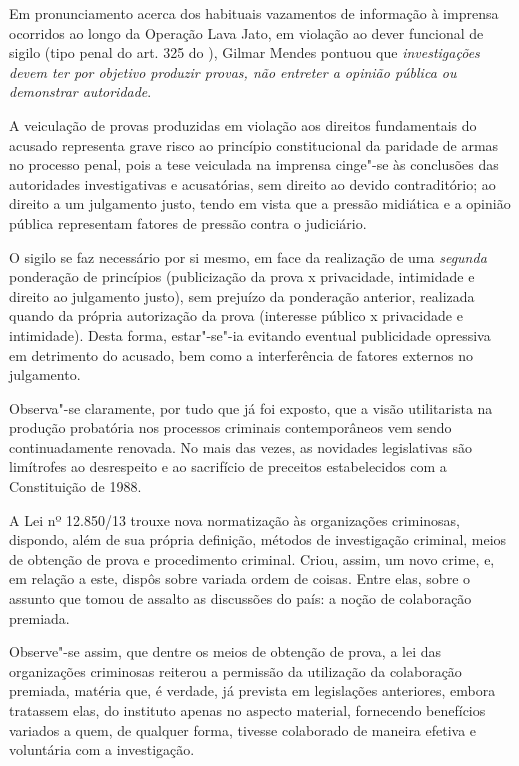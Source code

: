Em pronunciamento acerca dos habituais vazamentos de informação à
imprensa ocorridos ao longo da Operação Lava Jato, em violação ao dever
funcional de sigilo (tipo penal do art. 325 do ), Gilmar Mendes
pontuou que \emph{investigações devem ter por objetivo
produzir provas, não entreter a opinião pública ou demonstrar
autoridade}.

A veiculação de provas produzidas em violação aos direitos fundamentais
do acusado representa grave risco ao princípio constitucional da
paridade de armas no processo penal, pois a tese veiculada na imprensa
cinge"-se às conclusões das autoridades investigativas e acusatórias, sem
direito ao devido contraditório; ao direito a um julgamento justo, tendo
em vista que a pressão midiática e a opinião pública representam fatores
de pressão contra o judiciário.

O sigilo se faz necessário por si mesmo, em face da realização de uma
\emph{segunda} ponderação de princípios (publicização da prova x
privacidade, intimidade e direito ao julgamento justo), sem prejuízo da
ponderação anterior, realizada quando da própria autorização da prova
(interesse público x privacidade e intimidade). Desta forma, estar"-se"-ia
evitando eventual publicidade opressiva em detrimento do acusado, bem
como a interferência de fatores externos no julgamento.

Observa"-se claramente, por tudo que já foi exposto, que a visão
utilitarista na produção probatória nos processos criminais
contemporâneos vem sendo continuadamente renovada. No mais das vezes, as
novidades legislativas são limítrofes ao desrespeito e ao sacrifício de
preceitos estabelecidos com a Constituição de 1988.

A Lei nº 12.850/13 trouxe nova normatização às organizações criminosas,
dispondo, além de sua própria definição, métodos de investigação
criminal, meios de obtenção de prova e procedimento criminal. Criou,
assim, um novo crime, e, em relação a este, dispôs sobre variada ordem
de coisas. Entre elas, sobre o assunto que tomou de assalto as
discussões do país: a noção de colaboração premiada.

Observe"-se assim, que dentre os meios de obtenção de prova, a lei das
organizações criminosas reiterou a permissão da utilização da
colaboração premiada, matéria que, é verdade, já prevista em legislações
anteriores, embora tratassem elas, do instituto apenas no aspecto
material, fornecendo benefícios variados a quem, de qualquer forma,
tivesse colaborado de maneira efetiva e voluntária com a investigação.

